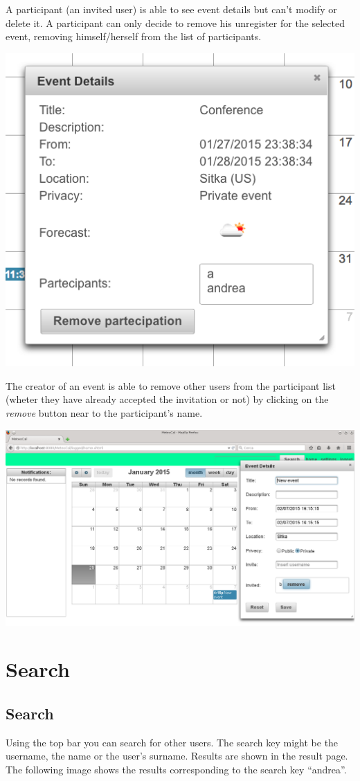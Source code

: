 \documentclass[10pt,a4paper,titlepage]{article}
\begin{document}
A participant (an invited user) is able to see event details but can’t modify or delete it. A participant can only decide to remove his unregister for the selected event, removing himself/herself from the list of participants.

\begin{center}
\includegraphics[width=0.7\linewidth]{./images/18_details_partecipant}
\end{center}

The creator of an event is able to remove other users from the participant list (wheter they have already accepted the invitation or not) by clicking on the \emph{remove} button near to the participant's name.

\includegraphics[width=\linewidth]{./images/18bis_remove_participant.png}

\section{Search}

\subsection{Search}
Using the top bar you can search for other users. The search key might be the username, the name or the user’s surname. Results are shown in the result page. The following image shows the results corresponding to the search key “andrea”.
\end{document}
